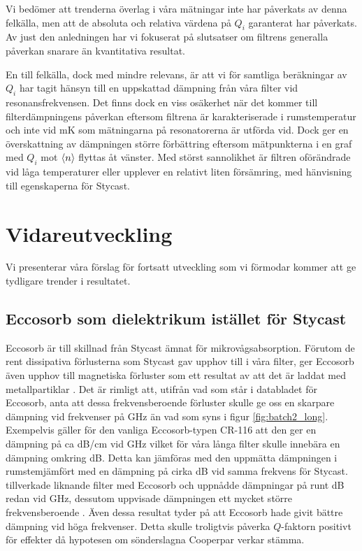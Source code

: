 \documentclass[main.tex]{subfiles}
\begin{document}
Vi bedömer att trenderna överlag i våra mätningar inte har påverkats av denna felkälla, men att de absoluta och relativa värdena på $Q_i$ garanterat har påverkats. Av just den anledningen har vi fokuserat på slutsatser om filtrens generalla påverkan snarare än kvantitativa resultat. 

En till felkälla, dock med mindre relevans, är att vi för samtliga beräkningar av $Q_i$ har tagit hänsyn till en uppskattad dämpning från våra filter vid resonansfrekvensen. Det finns dock en viss osäkerhet när det kommer till filterdämpningens påverkan eftersom filtrena är karakteriserade i rumstemperatur och inte vid \unit[10]{mK} som mätningarna på resonatorerna är utförda vid. Dock ger en överskattning av dämpningen större förbättring eftersom mätpunkterna i en graf med $Q_i$ mot $\expval{n}$ flyttas åt vänster. Med störst sannolikhet är filtren oförändrade vid låga temperaturer eller upplever en relativt liten försämring, med hänvisning till egenskaperna för Stycast.



\section{Vidareutveckling}
Vi presenterar våra förslag för fortsatt utveckling som vi förmodar kommer att ge tydligare trender i resultatet.

\subsection{Eccosorb som dielektrikum istället för Stycast}
Eccosorb är till skillnad från Stycast ämnat för mikrovågsabsorption. Förutom de rent dissipativa förlusterna som Stycast gav upphov till i våra filter, ger Eccosorb även upphov till magnetiska förluster som ett resultat av att det är laddat med metallpartiklar \cite{Eccosorb}. Det är rimligt att, utifrån vad som står i databladet för Eccosorb, anta att dessa frekvensberoende förluster skulle ge oss en skarpare dämpning vid frekvenser på \unit[8-50]{GHz} än vad som syns i figur \ref{fig:batch2_long}. Exempelvis gäller för den vanliga Eccosorb-typen CR-116 att den ger en dämpning på ca \unit[57]{dB/cm} vid \unit[18]{GHz} \cite{Eccosorb} vilket för våra långa filter skulle innebära en dämpning omkring \unit[150]{dB}. Detta kan jämföras med den uppmätta dämpningen i rumstemjämfört med en dämpning på cirka \unit[10]{dB} vid samma frekvens för Stycast. \citeauthor{santavicca2008} tillverkade liknande filter med Eccosorb och uppnådde dämpningar på runt \unit[80]{dB} redan vid \unit[10]{GHz}, dessutom uppvisade dämpningen ett mycket större frekvensberoende \cite{santavicca2008}. Även dessa resultat tyder på att Eccosorb hade givit bättre dämpning vid höga frekvenser. Detta skulle troligtvis påverka $Q$-faktorn positivt för effekter då hypotesen om sönderslagna Cooperpar verkar stämma.
\end{document}
